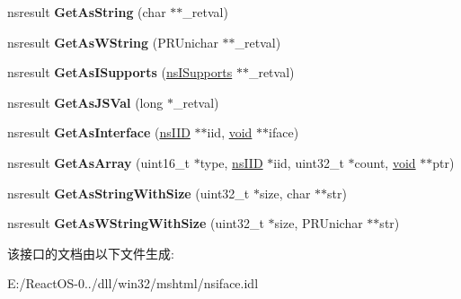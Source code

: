 \begin{DoxyCompactItemize}
\item 
\mbox{\label{interfacens_i_variant_ab5b8f0207db5d6ca9fccd3fca7f95da6}} 
nsresult {\bfseries Get\+As\+String} (char $\ast$$\ast$\+\_\+retval)
\item 
\mbox{\label{interfacens_i_variant_a743a2265101786e22b07b934806dd00b}} 
nsresult {\bfseries Get\+As\+W\+String} (P\+R\+Unichar $\ast$$\ast$\+\_\+retval)
\item 
\mbox{\label{interfacens_i_variant_a65554bd643d0575f9c8dcca3e0af5120}} 
nsresult {\bfseries Get\+As\+I\+Supports} (\hyperlink{interfacens_i_supports}{ns\+I\+Supports} $\ast$$\ast$\+\_\+retval)
\item 
\mbox{\label{interfacens_i_variant_a87cfa415301a720314814221dbf83572}} 
nsresult {\bfseries Get\+As\+J\+S\+Val} (long $\ast$\+\_\+retval)
\item 
\mbox{\label{interfacens_i_variant_a89548bc02d264e962fced866a20cc4eb}} 
nsresult {\bfseries Get\+As\+Interface} (\hyperlink{struct___i_i_d}{ns\+I\+ID} $\ast$$\ast$iid, \hyperlink{interfacevoid}{void} $\ast$$\ast$iface)
\item 
\mbox{\label{interfacens_i_variant_ab86acf1125f88c324217ed849a888652}} 
nsresult {\bfseries Get\+As\+Array} (uint16\+\_\+t $\ast$type, \hyperlink{struct___i_i_d}{ns\+I\+ID} $\ast$iid, uint32\+\_\+t $\ast$count, \hyperlink{interfacevoid}{void} $\ast$$\ast$ptr)
\item 
\mbox{\label{interfacens_i_variant_ae8b54a67972d6ec9bc7148bb2b4d9242}} 
nsresult {\bfseries Get\+As\+String\+With\+Size} (uint32\+\_\+t $\ast$size, char $\ast$$\ast$str)
\item 
\mbox{\label{interfacens_i_variant_a59ad4c0750fa093fc6d8a6b87f414a69}} 
nsresult {\bfseries Get\+As\+W\+String\+With\+Size} (uint32\+\_\+t $\ast$size, P\+R\+Unichar $\ast$$\ast$str)
\end{DoxyCompactItemize}


该接口的文档由以下文件生成\+:\begin{DoxyCompactItemize}
\item 
E\+:/\+React\+O\+S-\/0../dll/win32/mshtml/nsiface.\+idl\end{DoxyCompactItemize}
